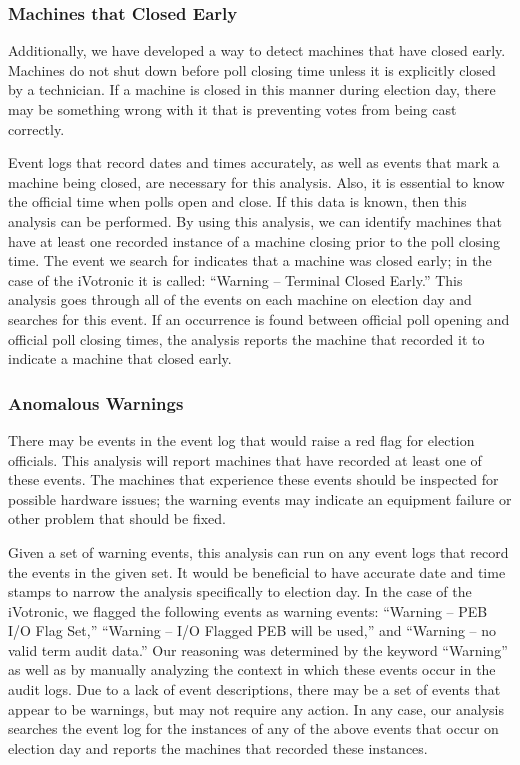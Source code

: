 \subsubsection{Machines that Closed Early}
Additionally, we have developed a way to detect machines that have closed early. Machines do not shut down before poll closing time unless it is explicitly closed by a technician. If a machine is closed in this manner during election day, there may be something wrong with it that is preventing votes from being cast correctly.
                  
Event logs that record dates and times accurately, as well as events that mark a machine being closed, are necessary for this analysis. Also, it is essential to know the official time when polls open and close. If this data is known, then this analysis can be performed. By using this analysis, we can identify machines that have at least one recorded instance of a machine closing prior to the poll closing time. The event we search for indicates that a machine was closed early; in the case of the iVotronic it is called: \textquotedblleft Warning – Terminal Closed Early.\textquotedblright \hspace{2 mm} This analysis goes through all of the events on each machine on election day and searches for this event. If an occurrence is found between official poll opening and official poll closing times, the analysis reports the machine that recorded it to indicate a machine that closed early.  
        
\subsubsection{Anomalous Warnings}
There may be events in the event log that would raise a red flag for election officials. This analysis will report machines that have recorded at least one of these events. The machines that experience these events should be inspected for possible hardware issues; the warning events may indicate an equipment failure or other problem that should be fixed.

Given a set of warning events, this analysis can run on any event logs that record the events in the given set. It would be beneficial to have accurate date and time stamps to narrow the analysis specifically to election day. In the case of the iVotronic, we flagged the following events as warning events: \textquotedblleft Warning – PEB I/O Flag Set,\textquotedblright \hspace{1 mm} \textquotedblleft Warning – I/O Flagged PEB will be used,\textquotedblright \hspace{1 mm} and \textquotedblleft Warning – no valid term audit data.\textquotedblright \hspace{2 mm} Our reasoning was determined by the keyword “Warning” as well as by manually analyzing the context in which these events occur in the audit logs. Due to a lack of event descriptions, there may be a set of events that appear to be warnings, but may not require any action. In any case, our analysis searches the event log for the instances of any of the above events that occur on election day and reports the machines that recorded these instances.  
